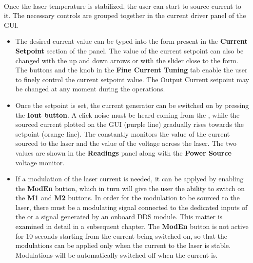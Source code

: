 \paragraph{} Once the laser temperature is stabilized, the user can start to source current to it. The necessary controls are grouped together in the current driver panel of the GUI.
\begin{itemize}
    \item The desired current value can be typed into the form present in the \textbf{Current Setpoint} section of the panel. The value of the current setpoint can also be changed with the up and down arrows or with the slider close to the form. 
    \newline The buttons and the knob in the \textbf{Fine Current Tuning} tab enable the user to finely control the current setpoint value.
    \newline The Output Current setpoint may be changed at any moment during the operations.
    
    \item Once the setpoint is set, the current generator can be switched on by pressing the \textbf{Iout button}. A click noise must be heard coming from the \QubeModel , while the sourced current plotted on the GUI (purple line) gradually rises towards the setpoint (orange line).
    \newline The \QubeModel  constantly monitors the value of the current sourced to the laser and the value of the voltage across the laser. The two values are shown in the \textbf{Readings} panel along with the \textbf{Power Source} voltage monitor.
    \item If a modulation of the laser current is needed, it can be applyed by enabling the \textbf{ModEn} button, which in turn will give the user the ability to switch on the \textbf{M1} and \textbf{M2} buttons.
    \newline In order for the modulation to be sourced to the laser, there must be a modulating signal connected to the dedicated inputs of the \QubeModel  or a signal generated by an onboard DDS module. This matter is examined in detail in a subsequent chapter.
    \newline The \textbf{ModEn} button is not active for 10 seconds starting from the current being switched on, so that the modulations can be applied only when the current to the laser is stable.
    \newline Modulations will be automatically switched off when the current is.
\end{itemize}


